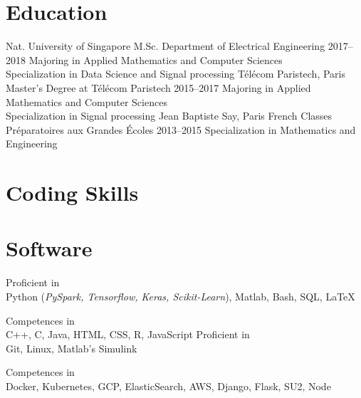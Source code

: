 \documentclass[]{source}
\begin{document}
\section{Education}
\begin{entrylist}
\bigskip
\entry
{\footnotesize{Nat. University of Singapore}}
{M.Sc. Department of Electrical Engineering}
{2017–2018}
{Majoring in Applied Mathematics and Computer Sciences\\
Specialization in Data Science and Signal processing }
\bigskip
\entry
{\footnotesize{Télécom Paristech, Paris}}
{Master's Degree at Télécom Paristech}
{2015–2017}
{Majoring in Applied Mathematics and Computer Sciences\\
Specialization in Signal processing}
\entry
{\footnotesize{Jean Baptiste Say, Paris}}
{French Classes Préparatoires aux Grandes Écoles}
{2013–2015}
{Specialization in Mathematics and Engineering }
\end{entrylist}
\vspace{0.2cm}
\begin{multicols}{2}
\section{Coding Skills}
\section{Software}
\end{multicols}
\begin{multicols}{2}
\parskip
Proficient in\\
Python (\textit{PySpark, Tensorflow, Keras,
Scikit-Learn}),
Matlab,
Bash, SQL, \LaTeX 
\vspace{0.3cm}

Competences in \\
C++, C, Java,
HTML, CSS, R, 
JavaScript
\parskip
Proficient in\\
Git, Linux, Matlab's Simulink
\vspace{0.3cm}

Competences in \\
Docker, Kubernetes, GCP, ElasticSearch, AWS, Django, Flask, SU2, Node
\vspace{0.3cm}

\end{multicols}
\end{document}
